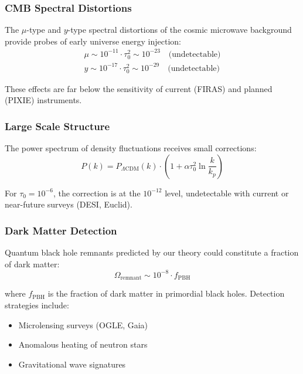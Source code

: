 \subsubsection{CMB Spectral Distortions}

The $\mu$-type and $y$-type spectral distortions of the cosmic microwave background provide probes of early universe energy injection:
\begin{align}
    \mu \sim 10^{-11} \cdot \tau_0^2 \sim 10^{-23} \quad \text{(undetectable)} \\
    y \sim 10^{-17} \cdot \tau_0^2 \sim 10^{-29} \quad \text{(undetectable)}
\end{align}

These effects are far below the sensitivity of current (FIRAS) and planned (PIXIE) instruments.

\subsubsection{Large Scale Structure}

The power spectrum of density fluctuations receives small corrections:
\begin{equation}
    P(k) = P_{\Lambda \text{CDM}}(k) \cdot \left(1 + \alpha \tau_0^2 \ln\frac{k}{k_p}\right)
\end{equation}

For $\tau_0 = 10^{-6}$, the correction is at the $10^{-12}$ level, undetectable with current or near-future surveys (DESI, Euclid).

\subsubsection{Dark Matter Detection}

Quantum black hole remnants predicted by our theory could constitute a fraction of dark matter:
\begin{equation}
    \Omega_{\text{remnant}} \sim 10^{-8} \cdot f_{\text{PBH}}
\end{equation}

where $f_{\text{PBH}}$ is the fraction of dark matter in primordial black holes. Detection strategies include:
\begin{itemize}
    \item Microlensing surveys (OGLE, Gaia)
    \item Anomalous heating of neutron stars
    \item Gravitational wave signatures
\end{itemize}

